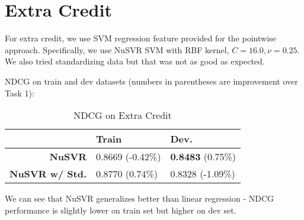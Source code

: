 \documentclass{article}
\begin{document}
\section{Extra Credit}

For extra credit, we use SVM regression feature provided for the pointwise approach.
Specifically, we use NuSVR SVM with RBF kernel, $C=16.0,\nu=0.25$. We also tried standardizing data but that was not as good as expected.

NDCG on train and dev datasets (numbers in parentheses are improvement over Task 1):

\begin{table}[!htb]
    \centering
    \begin{tabular}{| r | l | l |}
        \hline
        & \textbf{Train} & \textbf {Dev.} \\
        \hline
        \textbf{NuSVR} & 0.8669 (-0.42\%) & \textbf{0.8483} (0.75\%) \\
        \hline
        \textbf{NuSVR w/ Std.} & 0.8770 (0.74\%) & 0.8328 (-1.09\%) \\
        \hline
    \end{tabular}
    \caption{NDCG on Extra Credit}
\end{table}

We can see that NuSVR generalizes better than linear regression - NDCG performance is slightly lower on train set but higher on dev set.
\end{document}
